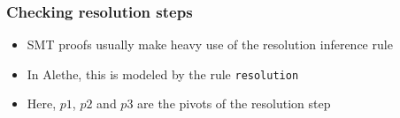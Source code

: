 \documentclass[usepdftitle=false,aspectratio=169]{beamer}
\newcommand\vitem{\vfill\item}
\begin{document}
\begin{frame}
  \frametitle{Checking resolution steps}
  \begin{itemize}
    \item SMT proofs usually make heavy use of the resolution inference rule
    \vitem In Alethe, this is modeled by the rule \texttt{resolution}
    \vfill
    \begin{prooftree}
    \end{prooftree}
    \pause
    \vitem Here, $p1$, $p2$ and $p3$ are the pivots of the resolution
    step
  \end{itemize}
\end{frame}
\end{document}
